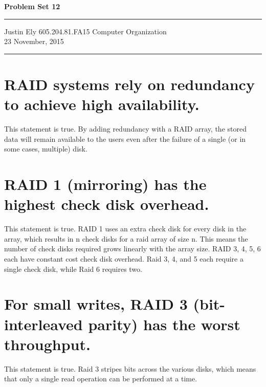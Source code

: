 \documentclass[a4paper,11pt]{article}
\begin{document}
\begin{flushright}

\vspace{1.1cm}

{\bf\Huge Problem Set 12}

\rule{0.25\linewidth}{0.5pt}

\vspace{0.5cm}
Justin Ely
\linebreak
\newline
\footnotesize{605.204.81.FA15 Computer Organization\\}
\vspace{0.5cm}
23 November, 2015
\end{flushright}

\noindent\rule{\linewidth}{1.0pt}



\section{RAID systems rely on redundancy to achieve high availability.}
This statement is true.  By adding redundancy with a RAID array, the stored data will remain available to the users even after the failure of a single (or in some cases, multiple) disk.


\section{RAID 1 (mirroring) has the highest check disk overhead.}
This statement is true.  RAID 1 uses an extra check disk for every disk in the array, which results in n check disks for a raid array of size n.  This means the number of check disks required grows linearly with the array size.  RAID 3, 4, 5, 6 each have constant cost check disk overhead.  Raid 3, 4, and 5 each require a single check disk, while Raid 6 requires two.


\section{For small writes, RAID 3 (bit-interleaved parity) has the worst throughput.}
This statement is true.  Raid 3 stripes bits across the various disks, which means that only a single read operation can be performed at a time.
\end{document}
